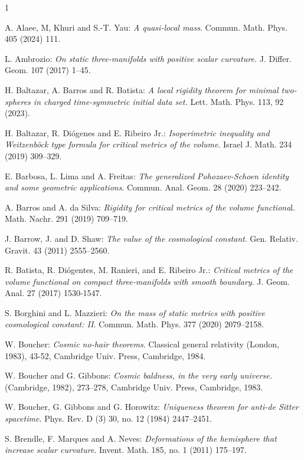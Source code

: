 \documentclass{amsart}
\numberwithin{equation}{section}
\begin{document}
	
	\begin{thebibliography}{1}
		
		 A. Alaee, M, Khuri and S.-T. Yau: \emph{A quasi-local mass}. Commun. Math. Phys. 405 (2024) 111.
		
		 L. Ambrozio: \emph{On static three-manifolds with positive scalar curvature.} J. Differ. Geom. 107 (2017) 1--45.
		
		 H. Baltazar, A. Barros and R. Batista: \emph{A local rigidity theorem for minimal two-spheres in charged time-symmetric initial data set.} Lett. Math. Phys. 113, 92 (2023).
		
 H. Baltazar, R. Di\'ogenes and E. Ribeiro Jr.: {\it Isoperimetric inequality and Weitzenb\"ock type formula for critical metrics of the volume}. Israel J. Math. 234 (2019) 309--329.

 E. Barbosa, L. Lima and A. Freitas: {\it The generalized Pohozaev-Schoen identity and some geometric applications}. Commun. Anal. Geom. 28 (2020) 223--242.

 A. Barros and A. da Silva: {\it Rigidity for critical metrics of the volume functiona}l. Math. Nachr. 291 (2019) 709--719.

 J. Barrow, J. and D. Shaw: {\it The value of the cosmological constant}. Gen. Relativ. Gravit. 43 (2011) 2555--2560.

 R. Batista, R. Di\'ogentes, M. Ranieri, and E. Ribeiro Jr.: {\it Critical metrics of the volume functional on compact three-manifolds with smooth boundary}. J. Geom. Anal. 27 (2017) 1530-1547.
		
		 S. Borghini and L. Mazzieri: {\it On the mass of static metrics with positive cosmological constant: II}. Commun. Math. Phys. 377 (2020) 2079--2158.
		
		 W. Boucher: \emph{Cosmic no-hair theorems}. Classical general relativity (London, 1983), 43-52, Cambridge Univ. Press, Cambridge, 1984. 
		
		 W. Boucher and G. Gibbons: \emph{ Cosmic baldness, in the very early universe.} (Cambridge, 1982), 273–278, Cambridge Univ. Press, Cambridge, 1983.
		
		 W. Boucher, G. Gibbons and G. Horowitz: \emph{ Uniqueness theorem for anti-de Sitter spacetime.} Phys. Rev. D (3) 30, no. 12 (1984) 2447--2451.
		
		 S. Brendle, F. Marques and A. Neves: \emph{ Deformations of the hemisphere that increase scalar curvature}. Invent. Math. 185, no. 1 (2011) 175--197.


\end{thebibliography}
\end{document}
